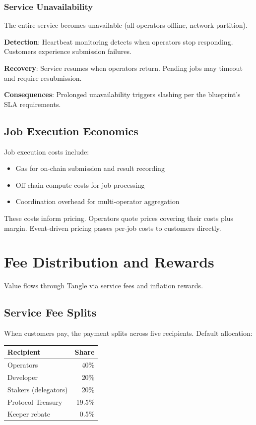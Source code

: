 \documentclass[11pt,a4paper]{article}
\begin{document}
\subsubsection{Service Unavailability}

The entire service becomes unavailable (all operators offline, network partition).

\textbf{Detection}: Heartbeat monitoring detects when operators stop responding. Customers experience submission failures.

\textbf{Recovery}: Service resumes when operators return. Pending jobs may timeout and require resubmission.

\textbf{Consequences}: Prolonged unavailability triggers slashing per the blueprint's SLA requirements.

\subsection{Job Execution Economics}

Job execution costs include:
\begin{itemize}[noitemsep]
    \item Gas for on-chain submission and result recording
    \item Off-chain compute costs for job processing
    \item Coordination overhead for multi-operator aggregation
\end{itemize}

These costs inform pricing. Operators quote prices covering their costs plus margin. Event-driven pricing passes per-job costs to customers directly.

\section{Fee Distribution and Rewards}

Value flows through Tangle via service fees and inflation rewards.

\subsection{Service Fee Splits}

When customers pay, the payment splits across five recipients. Default allocation:
\begin{center}
\begin{tabular}{lr}
\toprule
Recipient & Share \\
\midrule
Operators & 40\% \\
Developer & 20\% \\
Stakers (delegators) & 20\% \\
Protocol Treasury & 19.5\% \\
Keeper rebate & 0.5\% \\
\bottomrule
\end{tabular}
\end{center}
\end{document}
